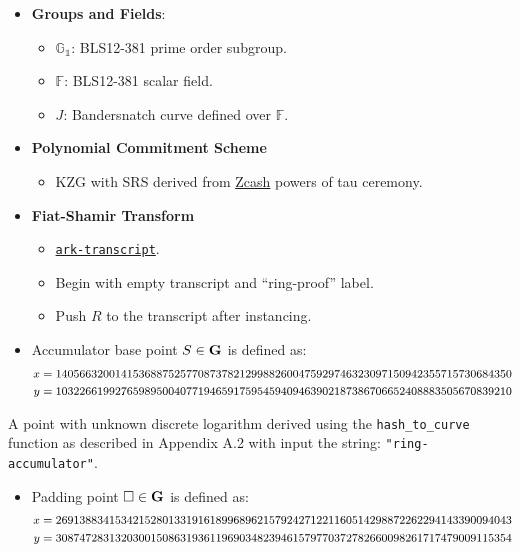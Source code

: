 \documentclass[
]{article}
\providecommand{\tightlist}{%
  \setlength{\itemsep}{0pt}\setlength{\parskip}{0pt}}
\begin{document}
\begin{itemize}
\tightlist
\item
  \textbf{Groups and Fields}:

  \begin{itemize}
  \tightlist
  \item
    \(\mathbb{G_1}\): BLS12-381 prime order subgroup.
  \item
    \(\mathbb{F}\): BLS12-381 scalar field.
  \item
    \(J\): Bandersnatch curve defined over \(\mathbb{F}\).
  \end{itemize}
\item
  \textbf{Polynomial Commitment Scheme}

  \begin{itemize}
  \tightlist
  \item
    KZG with SRS derived from
    \href{https://zfnd.org/conclusion-of-the-powers-of-tau-ceremony}{Zcash}
    powers of tau ceremony.
  \end{itemize}
\item
  \textbf{Fiat-Shamir Transform}

  \begin{itemize}
  \tightlist
  \item
    \href{https://crates.io/crates/ark-transcript}{\texttt{ark-transcript}}.
  \item
    Begin with empty transcript and ``ring-proof'' label.
  \item
    Push \(R\) to the transcript after instancing.
  \end{itemize}
\item
  Accumulator base point \(S \in \bold{G}\) is defined as:
  \[\footnotesize\begin{aligned}
  x &= 14056632001415368875257708737821299882600475929746323097150942355715730684350 \\
  y &= 10322661992765989500407719465917595459409463902187386706652408883505670839210
  \end{aligned}\]
\end{itemize}

A point with unknown discrete logarithm derived using the
\texttt{hash\_to\_curve} function as described in Appendix A.2 with
input the string: \texttt{"ring-accumulator"}.

\begin{itemize}
\tightlist
\item
  Padding point \(\square \in \bold{G}\) is defined as:
  \[\footnotesize\begin{aligned}
  x &= 26913883415342152801331916189968962157924271221160514298872262294143390094043 \\
  y &= 30874728313203001508631936119690348239461579770372782660098261717479009115354
  \end{aligned}\]
\end{itemize}
\end{document}
